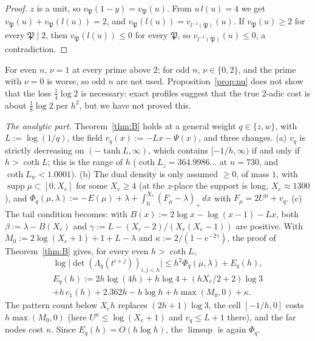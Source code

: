 \documentclass[11pt]{amsart}
\theoremstyle{definition}
\theoremstyle{remark}
\numberwithin{equation}{section}
\newcommand{\fP}{\mathfrak{P}}
\begin{document}
\begin{proof}
$z$ is a unit, so $v_\fP(1-y)=v_\fP(u)$. From $u\,l(u)=4$ we get $v_\fP(u)+v_\fP(l(u))=2$, and
$v_\fP(l(u))=v_{l^{-1}(\fP)}(u)$. If $v_\fP(u)\ge2$ for every $\fP\mid2$, then $v_\fP(l(u))\le0$ for every $\fP$, so
$v_{l^{-1}(\fP)}(u)\le0$, a contradiction.
\end{proof}

For even $n$, $\nu=1$ at every prime above $2$; for odd $n$, $\nu\in\{0,2\}$, and the prime with $\nu=0$ is worse, so odd
$n$ are not used. Proposition~\ref{prop:nu} does not show that the loss $\frac14\log2$ is necessary: exact profiles suggest
that the true $2$-adic cost is about $\frac18\log2$ per $h^2$, but we have not proved this.

\emph{The analytic part.} Theorem~\ref{thm:B} holds at a general weight $q\in\{z,w\}$, with $L:=\log(1/q)$, the field
$v_q(x):=-Lx-\Psi(x)$, and three changes. (a) $v_q$ is strictly decreasing on $(-\tanh L,\infty)$, which contains
$[-1/h,\infty)$ if and only if $h>\coth L$; this is the range of $h$ ($\coth L_z=364.9986\ldots$ at $n=730$, and
$\coth L_w<1.0001$). (b) The dual density is only assumed $\ge0$, of mass $1$, with $\operatorname{supp}\mu\subset[0,X_e]$
for some $X_e\ge4$ (at the $z$-place the support is long, $X_e\approx1300$), and $\Phi_q(\mu,\lambda):=-E(\mu)+\lambda+
\int_0^{X_e}(F_\mu-\lambda)_+\,dx$ with $F_\mu=2U^\mu+v_q$. (c) The tail condition becomes: with
$B(x):=2\log x-\log(x-1)-Lx$, both $\beta:=\lambda-B(X_e)$ and $\gamma:=L-(X_e-2)/(X_e(X_e-1))$ are positive. With
$M_0:=2\log(X_e+1)+1+L-\lambda$ and $\kappa:=2/(1-e^{-2\gamma})$, the proof of Theorem~\ref{thm:B} gives, for every even
$h>\coth L$,
\[
  \log\bigl|\det(\Lambda_q(t^{i+j}))_{i,j<h}\bigr|\le h^2\Phi_q(\mu,\lambda)+E_q(h),
\]
\begin{multline*}
  E_q(h):=2h\log(4h)+h\log4+(hX_e/2+2)\log3\\
  +h\,c_1(h)+2.362h-h\log h+h\max(M_0,0)+\kappa .
\end{multline*}
The pattern count below $X_eh$ replaces $(2h+1)\log3$, the cell $[-1/h,0]$ costs $h\max(M_0,0)$ (here $U^\mu\le\log(X_e+1)$
and $v_q\le L+1$ there), and the far nodes cost $\kappa$. Since $E_q(h)=O(h\log h)$, the $\limsup$ is again $\Phi_q$.
\end{document}

